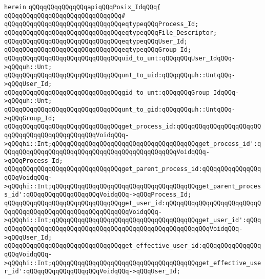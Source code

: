\verb|herein|\newline
\newline
\verb|qQQqqQQqqQQqqQQqapiqQQqPosix_IdqQQq{|\newline
\verb|qQQqqQQqqQQqqQQqqQQqqQQqqQQqqQQq#|\newline
\verb|qQQqqQQqqQQqqQQqqQQqqQQqqQQqqQQqeqtypeqQQqProcess_Id;|\newline
\verb|qQQqqQQqqQQqqQQqqQQqqQQqqQQqqQQqeqtypeqQQqFile_Descriptor;|\newline
\newline
\verb|qQQqqQQqqQQqqQQqqQQqqQQqqQQqqQQqeqtypeqQQqUser_Id;|\newline
\verb|qQQqqQQqqQQqqQQqqQQqqQQqqQQqqQQqeqtypeqQQqGroup_Id;|\newline
\newline
\verb|qQQqqQQqqQQqqQQqqQQqqQQqqQQqqQQquid_to_unt:qQQqqQQqUser_IdqQQq->qQQquh::Unt;|\newline
\verb|qQQqqQQqqQQqqQQqqQQqqQQqqQQqqQQqunt_to_uid:qQQqqQQquh::UntqQQq->qQQqUser_Id;|\newline
\verb|qQQqqQQqqQQqqQQqqQQqqQQqqQQqqQQqgid_to_unt:qQQqqQQqGroup_IdqQQq->qQQquh::Unt;|\newline
\verb|qQQqqQQqqQQqqQQqqQQqqQQqqQQqqQQqunt_to_gid:qQQqqQQquh::UntqQQq->qQQqGroup_Id;|\newline
\newline
\verb|qQQqqQQqqQQqqQQqqQQqqQQqqQQqqQQqget_process_id:qQQqqQQqqQQqqQQqqQQqqQQqqQQqqQQqqQQqqQQqqQQqqQQqVoidqQQq->qQQqhi::Int;qQQqqQQqqQQqqQQqqQQqqQQqqQQqqQQqqQQqqQQqget_process_id':qQQqqQQqqQQqqQQqqQQqqQQqqQQqqQQqqQQqqQQqqQQqqQQqVoidqQQq->qQQqProcess_Id;|\newline
\verb|qQQqqQQqqQQqqQQqqQQqqQQqqQQqqQQqget_parent_process_id:qQQqqQQqqQQqqQQqqQQqVoidqQQq->qQQqhi::Int;qQQqqQQqqQQqqQQqqQQqqQQqqQQqqQQqqQQqqQQqget_parent_process_id':qQQqqQQqqQQqqQQqqQQqVoidqQQq->qQQqProcess_Id;|\newline
\newline
\verb|qQQqqQQqqQQqqQQqqQQqqQQqqQQqqQQqget_user_id:qQQqqQQqqQQqqQQqqQQqqQQqqQQqqQQqqQQqqQQqqQQqqQQqqQQqqQQqqQQqVoidqQQq->qQQqhi::Int;qQQqqQQqqQQqqQQqqQQqqQQqqQQqqQQqqQQqqQQqget_user_id':qQQqqQQqqQQqqQQqqQQqqQQqqQQqqQQqqQQqqQQqqQQqqQQqqQQqqQQqqQQqVoidqQQq->qQQqUser_Id;|\newline
\verb|qQQqqQQqqQQqqQQqqQQqqQQqqQQqqQQqget_effective_user_id:qQQqqQQqqQQqqQQqqQQqVoidqQQq->qQQqhi::Int;qQQqqQQqqQQqqQQqqQQqqQQqqQQqqQQqqQQqqQQqget_effective_user_id':qQQqqQQqqQQqqQQqqQQqVoidqQQq->qQQqUser_Id;|\newline
\newline
